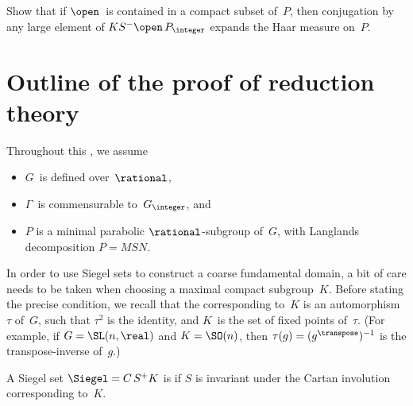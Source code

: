 \begin{exercises}
\item \label{SiegelContracts}
Show that if $\open$\, is contained in a compact subset of~$P$, then conjugation by any large element of $K S^- \open\, P_{\integer}$ expands the Haar measure on~$P$.

\end{exercises}











\section{Outline of the proof of reduction theory} \label{RedThyPfSect}

\begin{notation}
Throughout this , we assume 
	\begin{itemize}
	\item $G$~is defined over~$\rational$, 
	\item $\Gamma$~is commensurable to~$G_\integer$,
	and 
	\item $P$ is a minimal parabolic $\rational$-subgroup of~$G$, with Langlands decomposition $P = MSN$.
	\end{itemize}
\end{notation}

In order to use Siegel sets to construct a coarse fundamental domain, a bit of care needs to be taken when choosing a maximal compact subgroup~$K$. Before stating the precise condition, we recall that the  corresponding to~$K$ is an automorphism~$\tau$ of~$G$, such that $\tau^2$ is the identity, and $K$~is the set of fixed points of~$\tau$. (For example, if $G = \SL(n,\real)$ and $K = \SO(n)$, then $\tau(g) = (g^\transpose)^{-1}$ is the transpose-inverse of~$g$.)

\begin{defn}
A Siegel set $\Siegel = C \, S^+ K$ is  if $S$ is invariant under the Cartan involution corresponding to~$K$.
\end{defn}

